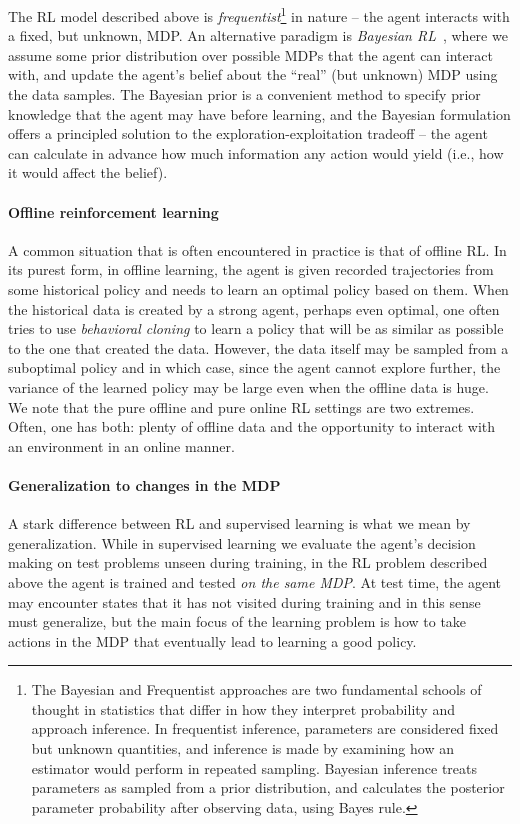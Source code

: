 The RL model described above is \textit{frequentist}\footnote{The Bayesian and Frequentist approaches are two fundamental schools of thought in statistics that differ in how they interpret probability and approach inference. In frequentist inference, parameters are considered fixed but unknown quantities, and inference is made by examining how an estimator would perform in repeated sampling. Bayesian inference treats parameters as sampled from a prior distribution, and calculates the posterior parameter probability after observing data, using Bayes rule.} in nature -- the agent interacts with a fixed, but unknown, MDP. An alternative paradigm is \textit{Bayesian RL}~\cite{ghavamzadeh2015bayesian}, where we assume some prior distribution over possible MDPs that the agent can interact with, and update the agent's belief about the ``real'' (but unknown) MDP using the data samples. The Bayesian prior is a convenient method to specify prior knowledge that the agent may have before learning, and the Bayesian formulation offers a principled solution to the exploration-exploitation tradeoff -- the agent can calculate in advance how much information any action would yield (i.e., how it would affect the belief). 

\paragraph{Offline reinforcement learning}
A common situation that is often encountered in practice is that of offline RL. In its purest form, in offline learning, the agent is given recorded trajectories from some historical policy and needs to learn an optimal policy based on them. When the historical data is created by a strong agent, perhaps even optimal, one often tries to use {\em behavioral cloning} to learn a policy that will be as similar as possible to the one that created the data.  However, the data itself may be sampled from a suboptimal policy and in which case, since the agent cannot explore further, the variance of the learned policy may be large even when the offline data is huge. We note that the pure offline and pure online RL settings are two extremes. Often, one has both: plenty of offline data and the opportunity to interact with an environment in an online manner. 


\paragraph{Generalization to changes in the MDP}
A stark difference between RL and supervised learning is what we mean by generalization. While in supervised learning we evaluate the agent's decision making on test problems unseen during training, in the RL problem described above the agent is trained and tested \textit{on the same MDP}. At test time, the agent may encounter states that it has not visited during training and in this sense must generalize, but the main focus of the learning problem is how to take actions in the MDP that eventually lead to learning a good policy.

